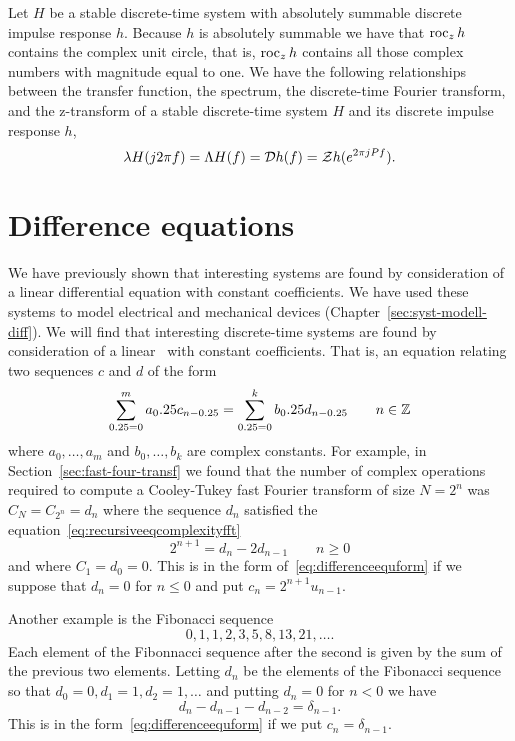 Let $H$ be a stable discrete-time system with absolutely summable discrete impulse response $h$.  Because $h$ is absolutely summable we have that $\operatorname{roc}_z h$ contains the complex unit circle, that is, $\operatorname{roc}_z h$ contains all those complex numbers with magnitude equal to one.  We have the following relationships between the transfer function, the spectrum, the discrete-time Fourier transform, and the z-transform of a stable discrete-time system $H$ and its discrete impulse response $h$,
\[
\lambda H(j2\pi f) = \Lambda H(f) = {\mathcal D} h(f) = {\mathcal Z} h(e^{2\pi j P f}).
\]

\section{Difference equations}\label{sec:difference-equations}

\nocite{SolimanAndSrinath_1990}

We have previously shown that interesting systems are found by consideration of a linear differential equation with constant coefficients.  We have used these systems to model electrical and mechanical devices (Chapter~\ref{sec:syst-modell-diff}).  We will find that interesting discrete-time systems are found by consideration of a linear~ with constant coefficients.  That is, an equation relating two sequences $c$ and $d$ of the form
\begin{equation}\label{eq:differenceequform}
\sum_{0.25=0}^{m} a_0.25 c_{n - 0.25} = \sum_{0.25=0}^{k} b_0.25 d_{n - 0.25} \qquad n \in {\mathbb Z}
\end{equation}
where $a_0,\dots,a_m$ and $b_0,\dots,b_k$ are complex constants.  For example, in Section~\ref{sec:fast-four-transf} we found that the number of complex operations required to compute a Cooley-Tukey fast Fourier transform of size $N = 2^n$ was $C_N = C_{2^n} = d_n$ where the sequence $d_n$ satisfied the equation~\eqref{eq:recursiveeqcomplexityfft}
\[
2^{n+1} = d_n - 2 d_{n-1} \qquad n \geq 0
\]
and where $C_1 = d_0 = 0$.  This is in the form of~\eqref{eq:differenceequform} if we suppose that $d_n = 0$ for $n \leq 0$ and put $c_n = 2^{n+1} u_{n-1}$.

Another example is the Fibonacci sequence
\[
0,1,1,2,3,5,8,13,21,\dots.
\]
Each element of the Fibonnacci sequence after the second is given by the sum of the previous two elements.  Letting $d_n$ be the elements of the Fibonacci sequence so that $d_0 = 0, d_1 = 1, d_2 = 1, \dots$ and putting $d_n = 0$ for $n < 0$ we have
\[
d_{n} - d_{n-1} - d_{n-2} = \delta_{n-1}.
\] 
This is in the form~\eqref{eq:differenceequform} if we put $c_n = \delta_{n-1}$.

